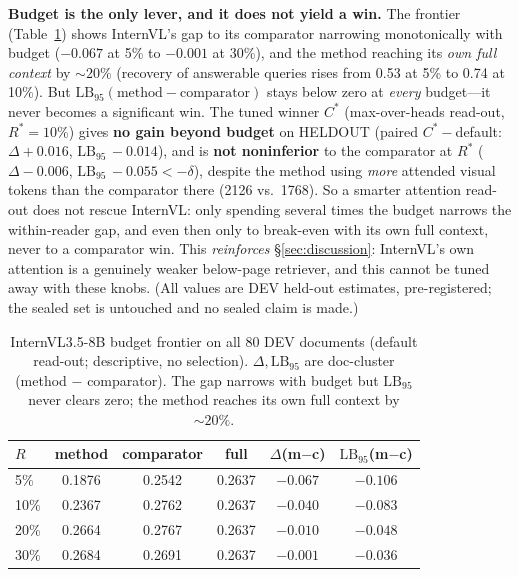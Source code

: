 \documentclass[letterpaper]{article} %
\begin{document}
\textbf{Budget is the only lever, and it does not yield a win.} The frontier (Table~\ref{tab:internvl-frontier})
shows InternVL's gap to its comparator narrowing monotonically with budget ($-0.067$ at 5\% to $-0.001$ at 30\%), and
the method reaching its \emph{own full context} by ${\sim}20\%$ (recovery of answerable queries rises from 0.53 at
5\% to 0.74 at 10\%). But $\mathrm{LB}_{95}(\textrm{method}-\textrm{comparator})$ stays below zero at \emph{every}
budget---it never becomes a significant win. The tuned winner $C^*$ (max-over-heads read-out, $R^*{=}10\%$) gives
\textbf{no gain beyond budget} on HELDOUT (paired $C^*{-}$default: $\Delta{+}0.016$, $\mathrm{LB}_{95}\,{-}0.014$),
and is \textbf{not noninferior} to the comparator at $R^*$ ($\Delta{-}0.006$, $\mathrm{LB}_{95}\,{-}0.055 < -\delta$),
despite the method using \emph{more} attended visual tokens than the comparator there (2126 vs.\ 1768). So a smarter
attention read-out does not rescue InternVL: only spending several times the budget narrows the within-reader gap, and
even then only to break-even with its own full context, never to a comparator win. This \emph{reinforces}
\S\ref{sec:discussion}: InternVL's own attention is a genuinely weaker below-page retriever, and this cannot be tuned
away with these knobs. (All values are DEV held-out estimates, pre-registered; the sealed set is untouched and no
sealed claim is made.)

\begin{table}[t]
\centering
\caption{InternVL3.5-8B budget frontier on all 80 DEV documents (default read-out; descriptive, no selection).
$\Delta,\mathrm{LB}_{95}$ are doc-cluster (method $-$ comparator). The gap narrows with budget but $\mathrm{LB}_{95}$
never clears zero; the method reaches its own full context by ${\sim}20\%$.}
\label{tab:internvl-frontier}
\small
\begin{tabular}{@{}lccccc@{}}
\toprule
$R$ & method & comparator & full & $\Delta$(m$-$c) & $\mathrm{LB}_{95}$(m$-$c) \\
\midrule
5\%  & 0.1876 & 0.2542 & 0.2637 & $-0.067$ & $-0.106$ \\
10\% & 0.2367 & 0.2762 & 0.2637 & $-0.040$ & $-0.083$ \\
20\% & 0.2664 & 0.2767 & 0.2637 & $-0.010$ & $-0.048$ \\
30\% & 0.2684 & 0.2691 & 0.2637 & $-0.001$ & $-0.036$ \\
\bottomrule
\end{tabular}
\end{table}
\end{document}
